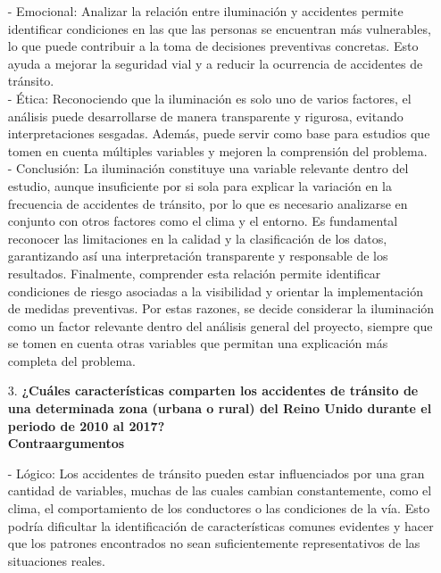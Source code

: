 \documentclass[12pt]{article}
\begin{document}
\begin{itemize}
    - Emocional: Analizar la relación entre iluminación y accidentes permite identificar condiciones en las que las personas se encuentran más vulnerables, lo que puede contribuir a la toma de decisiones preventivas concretas. Esto ayuda a mejorar la seguridad vial y a reducir la ocurrencia de accidentes de tránsito. \\
    
    - Ética: Reconociendo que la iluminación es solo uno de varios factores, el análisis puede desarrollarse de manera transparente y rigurosa, evitando interpretaciones sesgadas. Además, puede servir como base para estudios que tomen en cuenta múltiples variables y mejoren la comprensión del problema. \\
    
    - Conclusión: La iluminación constituye una variable relevante dentro del estudio, aunque insuficiente por si sola para explicar la variación en la frecuencia de accidentes de tránsito, por lo que es necesario analizarse en conjunto con otros factores como el clima y el entorno. Es fundamental reconocer las limitaciones en la calidad y la clasificación de los datos, garantizando así una interpretación transparente y responsable de los resultados. Finalmente, comprender esta relación permite identificar condiciones de riesgo asociadas a la visibilidad y orientar la implementación de medidas preventivas. Por estas razones, se decide considerar la iluminación como un factor relevante dentro del análisis general del proyecto, siempre que se tomen en cuenta otras variables que permitan una explicación más completa del problema. \\ 
   
    \item[3.] \textbf{¿Cuáles características comparten los accidentes de tránsito de una determinada zona (urbana o rural) del Reino Unido durante el periodo de 2010 al 2017?}\\
       
    \textbf{Contraargumentos}
    
    - Lógico: Los accidentes de tránsito pueden estar influenciados por una gran cantidad de variables, muchas de las cuales cambian constantemente, como el clima, el comportamiento de los conductores o las condiciones de la vía. Esto podría dificultar la identificación de características comunes evidentes y hacer que los patrones encontrados no sean suficientemente representativos de las situaciones reales. \\
    

\end{itemize}
\end{document}
